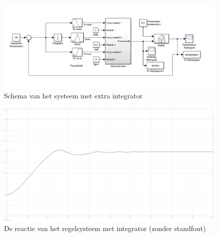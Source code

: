 \documentclass[a4paper, 12pt]{article}
\begin{document}
\begin{figure}[!h]
	\includegraphics[width=1\linewidth]{Labo4_1_system_no_error.jpg}
	\caption{Schema van het systeem met extra integrator}
\end{figure}

\begin{figure}[!h]
	\includegraphics[width=1\linewidth]{Labo4_1_temperatuur_no_stand_fout.jpg}
	\caption{De reactie van het regelsysteem met integrator (zonder standfout)}
\end{figure}
\end{document}

